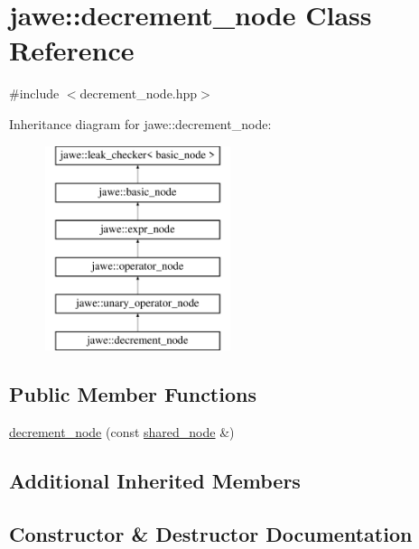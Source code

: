 \hypertarget{classjawe_1_1decrement__node}{}\section{jawe\+:\+:decrement\+\_\+node Class Reference}
\label{classjawe_1_1decrement__node}


{\ttfamily \#include $<$decrement\+\_\+node.\+hpp$>$}

Inheritance diagram for jawe\+:\+:decrement\+\_\+node\+:\begin{figure}[H]
\begin{center}
\leavevmode
\includegraphics[height=6.000000cm]{classjawe_1_1decrement__node}
\end{center}
\end{figure}
\subsection*{Public Member Functions}
\begin{DoxyCompactItemize}
\item 
\hyperlink{classjawe_1_1decrement__node_aa1b25e1059bf8dc485bccd5a029dbea3}{decrement\+\_\+node} (const \hyperlink{namespacejawe_a3f307481d921b6cbb50cc8511fc2b544}{shared\+\_\+node} \&)
\end{DoxyCompactItemize}
\subsection*{Additional Inherited Members}


\subsection{Constructor \& Destructor Documentation}
\mbox{\label{classjawe_1_1decrement__node_aa1b25e1059bf8dc485bccd5a029dbea3}} 
